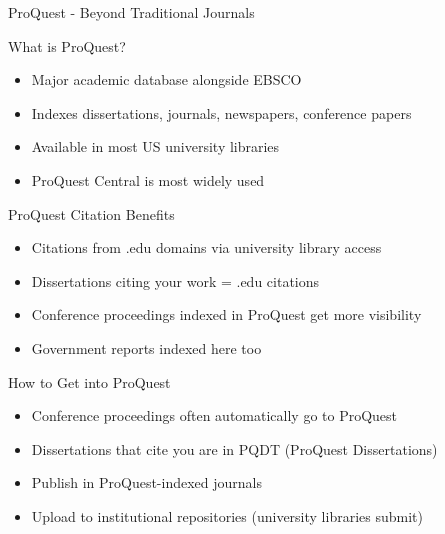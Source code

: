\documentclass[11pt]{beamer}
\begin{document}
	\begin{frame}{ProQuest - Beyond Traditional Journals}
		\scriptsize
		\begin{block}{What is ProQuest?}
			\begin{itemize}
				\item Major academic database alongside EBSCO
				\item Indexes dissertations, journals, newspapers, conference papers
				\item Available in most US university libraries
				\item ProQuest Central is most widely used
			\end{itemize}
		\end{block}
		\begin{block}{ProQuest Citation Benefits}
			\begin{itemize}
				\item Citations from .edu domains via university library access
				\item Dissertations citing your work = .edu citations
				\item Conference proceedings indexed in ProQuest get more visibility
				\item Government reports indexed here too
			\end{itemize}
		\end{block}
		\begin{block}{How to Get into ProQuest}
			\begin{itemize}
				\item Conference proceedings often automatically go to ProQuest
				\item Dissertations that cite you are in PQDT (ProQuest Dissertations)
				\item Publish in ProQuest-indexed journals
				\item Upload to institutional repositories (university libraries submit)
			\end{itemize}
		\end{block}
	\end{frame}
	
\end{document}
